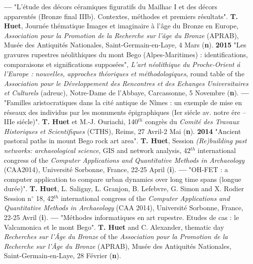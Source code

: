 \documentclass{article}
\begin{document}
\smallbreak
\textbf{--- }"L'\'{e}tude des d\'{e}cors c\'{e}ramiques figuratifs du Mailhac I et des d\'{e}cors apparent\'{e}s (Bronze final IIIb). Contextes, m\'{e}thodes et premiers r\'{e}sultats". \textbf{T. Huet}, Journ\'{e}e th\'{e}matique Images et imaginaire \`{a} l'\^{a}ge du Bronze en Europe, \textit{Association pour la Promotion de la Recherche sur l'\^{a}ge du Bronze} (APRAB), Mus\'{e}e des Antiquit\'{e}s Nationales, Saint-Germain-en-Laye, 4 Mars (\textbf{n}).
\smallbreak
\textbf{2015 }"Les gravures rupestres n\'{e}olithiques du mont Bego (Alpes-Maritimes) : identifications, comparaisons et significations suppos\'{e}es", \textit{L'art n\'{e}olithique du Proche-Orient \'{a} l'Europe : nouvelles, approches th\'{e}oriques et m\'{e}thodologiques}, round table of the \textit{Association pour le D\'{e}veloppement des Rencontres et des Echanges Universitaires et Culturels} (adreuc), Notre-Dame de l'Abbaye, Carcassonne, 5 Novembre (\textbf{n}).
\smallbreak
\textbf{--- }"Familles aristocratiques dans la cit\'{e} antique de N\^{i}mes : un exemple de mise en r\'{e}seaux des individus par les monuments \'{e}pigraphiques (Ier si\'{e}cle av. notre \'{e}re -- IIIe si\'{e}cle)". \textbf{T. Huet} et M.-J. Ouriachi, 140${}^{th}$ congrès du \textit{Comit\'{e} des Travaux Historiques et Scientifiques} (CTHS), Reims, 27 Avril-2 Mai (\textbf{n}).
\smallbreak
\textbf{2014 }"Ancient pastoral paths in mount Bego rock art area". \textbf{T. Huet}, Session \textit{(Re)building past networks: archaeological science}, GIS and network analysis, 42${}^{th}$ international congress of the \textit{Computer Applications and Quantitative Methods in Archaeology} (CAA2014), Universit\'{e} Sorbonne, France, 22-25 April (\textbf{i}).
\smallbreak
\textbf{--- }"OH-FET : a computer application to compare urban dynamics over long time spans (longue dur\'{e}e)". \textbf{T. Huet}, L. Saligny, L. Granjon, B. Lefebvre, G. Simon and X. Rodier Session n$\mathrm{{}^\circ}$ 18, 42${}^{th}$ international congress of the \textit{Computer Applications and Quantitative Methods in Archaeology} (CAA 2014), Universit\'{e} Sorbonne, France, 22-25 Avril (\textbf{i}).
\smallbreak
\textbf{--- }"M\'{e}thodes informatiques en art rupestre. Etudes de cas : le Valcamonica et le mont Bego". \textbf{T. Huet} and C. Alexander, thematic day \textit{Recherches sur l'\^{A}ge du Bronze }of the\textit{ Association pour la Promotion de la Recherche sur l'\^{A}ge du Bronze }(APRAB), Mus\'{e}e des Antiquit\'{e}s Nationales, Saint-Germain-en-Laye, 28 Février (\textbf{n}).
\end{document}
